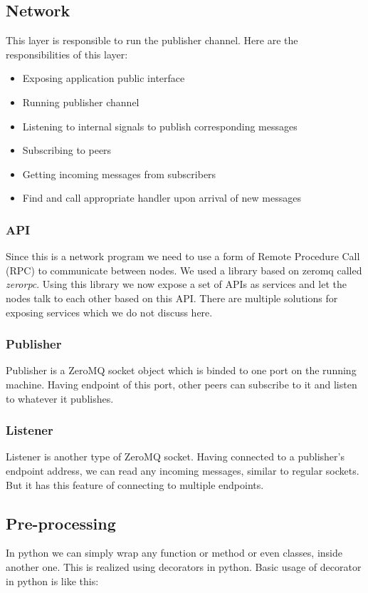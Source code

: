 \subsection{Network}
This layer is responsible to run the publisher channel. 
Here are the responsibilities of this layer:

\begin{itemize}
\item Exposing application public interface
\item Running publisher channel
\item Listening to internal signals to publish corresponding messages
\item Subscribing to peers
\item Getting incoming messages from subscribers 
\item Find and call appropriate handler upon arrival of new messages
\end{itemize}

\subsubsection{API}
Since this is a network program we need to use a form of Remote Procedure Call (RPC) 
to communicate between nodes. We used a library based on zeromq 
called \textit{zerorpc}. Using this library we now expose a set of APIs as services and let the nodes talk to 
each other based on this API. There are multiple solutions for exposing services which we do not discuss here.

\subsubsection{Publisher}
Publisher is a ZeroMQ socket object which is binded to one port on the running machine. 
Having endpoint of this port, other peers can subscribe to it and listen to whatever it publishes.

\subsubsection{Listener}
Listener is another type of ZeroMQ socket. 
Having connected to a publisher's endpoint address, 
we can read any incoming messages, similar to regular sockets.
But it has this feature of connecting to multiple endpoints.

\subsection{Pre-processing}
In python we can simply wrap any function or method or even classes, inside another one.
This is realized using decorators in python. 
Basic usage of decorator in python is like this:

